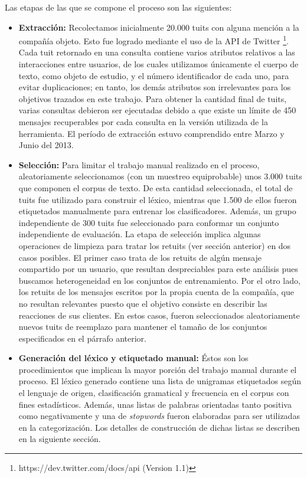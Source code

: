 Las etapas de las que se compone el proceso son las siguientes:
\begin{itemize}
\item \textbf{Extracci\'on:} Recolectamos inicialmente 20.000 tuits con alguna menci\'on a la compa\~n\'ia objeto. Esto fue logrado mediante el uso de la API de Twitter \footnote{https://dev.twitter.com/docs/api (Version 1.1)}.  Cada tuit retornado en una consulta contiene varios atributos relativos a las interacciones entre usuarios, de los cuales utilizamos \'unicamente el cuerpo de texto, como objeto de estudio, y el n\'umero identificador de cada uno, para evitar duplicaciones; en tanto, los dem\'as atributos son irrelevantes para los objetivos trazados en este trabajo. Para obtener la cantidad final de tuits, varias consultas debieron ser ejecutadas debido a que existe un l\'imite de 450 mensajes recuperables por cada consulta en la versi\'on utilizada de la herramienta. El per\'iodo de extracci\'on estuvo comprendido entre Marzo y Junio del 2013.
\item \textbf{Selecci\'on:} Para limitar el trabajo manual realizado en el proceso, aleatoriamente seleccionamos (con un muestreo equiprobable) unos 3.000 tuits que componen el corpus de texto. De esta cantidad seleccionada, el total de tuits fue utilizado para construir el l\'exico, mientras que 1.500 de ellos fueron etiquetados manualmente para entrenar los clasificadores. Adem\'as, un grupo independiente de 300 tuits fue seleccionado para conformar un conjunto independiente de evaluaci\'on.
\newline \newline
La etapa de selecci\'on implica algunas operaciones de limpieza para tratar los retuits  (ver secci\'on anterior) en dos casos posibles. El primer caso trata de los retuits de alg\'un mensaje compartido por un usuario, que resultan despreciables para este an\'alisis pues buscamos heterogeneidad en los conjuntos de entrenamiento. Por el otro lado, los retuits de los mensajes escritos por la propia cuenta de la compa\~n\'ia, que no resultan relevantes puesto que el objetivo consiste en describir las reacciones de sus clientes. En estos casos, fueron seleccionados aleatoriamente nuevos tuits de reemplazo para mantener el tama\~no de los conjuntos especificados en el p\'arrafo anterior.
\item \textbf{Generaci\'on del l\'exico y etiquetado manual:} \'Estos son los procedimientos que implican la mayor porci\'on del trabajo manual durante el proceso. El l\'exico generado contiene una lista de unigramas etiquetados seg\'un el lenguaje de origen, clasificaci\'on gramatical y frecuencia en el corpus con fines estad\'isticos. Adem\'as, unas listas de palabras orientadas tanto positiva como negativamente y una de \textit{stopwords} fueron elaboradas para ser utilizadas en la categorizaci\'on. Los detalles de construcci\'on de dichas listas se describen en la siguiente secci\'on.

\end{itemize}
